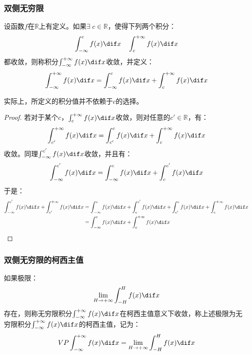 \subsubsection{双侧无穷限}
\begin{definition}
	设函数$f$在$\mathbb{R}$上有定义。如果$\exists\;c\in\mathbb{R}$，使得下列两个积分：
	\begin{equation*}
		\int_{-\infty}^{c}f(x)\dif x\quad
		\int_{c}^{+\infty}f(x)\dif x
	\end{equation*}
	都收敛，则称积分$\int_{-\infty}^{+\infty}f(x)\dif x$收敛，并定义：
	\begin{equation*}
		\int_{-\infty}^{+\infty}f(x)\dif x=\int_{-\infty}^{c}f(x)\dif x+
		\int_{c}^{+\infty}f(x)\dif x
	\end{equation*}
\end{definition}
实际上，所定义的积分值并不依赖于$c$的选择。
\begin{proof}
	若对于某个$c$，$\int_{c}^{+\infty}f(x)\dif x$收敛，则对任意的$c'\in\mathbb{R}$，有：
	\begin{equation*}
		\int_{c'}^{+\infty}f(x)\dif x=\int_{c'}^{c}f(x)\dif x+\int_{c}^{+\infty}f(x)\dif x
	\end{equation*}
	收敛。同理$\int_{-\infty}^{c'}f(x)\dif x$收敛，并且有：
	\begin{equation*}
		\int_{-\infty}^{c'}f(x)\dif x=\int_{-\infty}^{c}f(x)\dif x+\int_{c}^{c'}f(x)\dif x
	\end{equation*}
	于是：
	\begin{align*}
		\int_{-\infty}^{c'}f(x)\dif x+\int_{c'}^{+\infty}f(x)\dif x
		&=\int_{-\infty}^{c}f(x)\dif x+\int_{c}^{c'}f(x)\dif x+\int_{c'}^{c}f(x)\dif x+\int_{c}^{+\infty}f(x)\dif x \\
		&=\int_{-\infty}^{c}f(x)\dif x+\int_{c}^{+\infty}f(x)\dif x\qedhere
	\end{align*}
\end{proof}
\subsubsection{双侧无穷限的柯西主值}
\begin{definition}
	如果极限：
	\begin{equation*}
		\lim_{H\to+\infty}\int_{-H}^{H}f(x)\dif x
	\end{equation*}
	存在，则称无穷限积分$\int_{-\infty}^{+\infty}f(x)\dif x$在柯西主值意义下收敛，称上述极限为无穷限积分$\int_{-\infty}^{+\infty}f(x)\dif x$的柯西主值，记为：
	\begin{equation*}
		VP\int_{-\infty}^{+\infty}f(x)\dif x=\lim_{H\to+\infty}\int_{-H}^{H}f(x)\dif x
	\end{equation*}
\end{definition}

